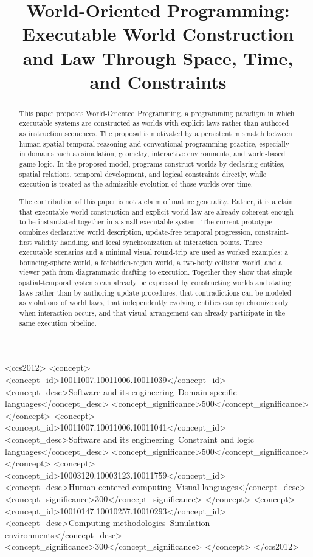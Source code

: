 \documentclass[sigplan,review,anonymous]{acmart}
\begin{document}
\title{World-Oriented Programming:\\Executable World Construction and Law Through Space, Time, and Constraints}


\begin{abstract}
This paper proposes World-Oriented Programming, a programming paradigm in which executable systems are constructed as worlds with explicit laws rather than authored as instruction sequences.
The proposal is motivated by a persistent mismatch between human spatial-temporal reasoning and conventional programming practice, especially in domains such as simulation, geometry, interactive environments, and world-based game logic.
In the proposed model, programs construct worlds by declaring entities, spatial relations, temporal development, and logical constraints directly, while execution is treated as the admissible evolution of those worlds over time.

The contribution of this paper is not a claim of mature generality.
Rather, it is a claim that executable world construction and explicit world law are already coherent enough to be instantiated together in a small executable system.
The current prototype combines declarative world description, update-free temporal progression, constraint-first validity handling, and local synchronization at interaction points.
Three executable scenarios and a minimal visual round-trip are used as worked examples: a bouncing-sphere world, a forbidden-region world, a two-body collision world, and a viewer path from diagrammatic drafting to execution.
Together they show that simple spatial-temporal systems can already be expressed by constructing worlds and stating laws rather than by authoring update procedures, that contradictions can be modeled as violations of world laws, that independently evolving entities can synchronize only when interaction occurs, and that visual arrangement can already participate in the same execution pipeline.
\end{abstract}

\begin{CCSXML}
<ccs2012>
<concept>
<concept_id>10011007.10011006.10011039</concept_id>
<concept_desc>Software and its engineering~Domain specific languages</concept_desc>
<concept_significance>500</concept_significance>
</concept>
<concept>
<concept_id>10011007.10011006.10011041</concept_id>
<concept_desc>Software and its engineering~Constraint and logic languages</concept_desc>
<concept_significance>500</concept_significance>
</concept>
<concept>
<concept_id>10003120.10003123.10011759</concept_id>
<concept_desc>Human-centered computing~Visual languages</concept_desc>
<concept_significance>300</concept_significance>
</concept>
<concept>
<concept_id>10010147.10010257.10010293</concept_id>
<concept_desc>Computing methodologies~Simulation environments</concept_desc>
<concept_significance>300</concept_significance>
</concept>
</ccs2012>
\end{CCSXML}
\end{document}
